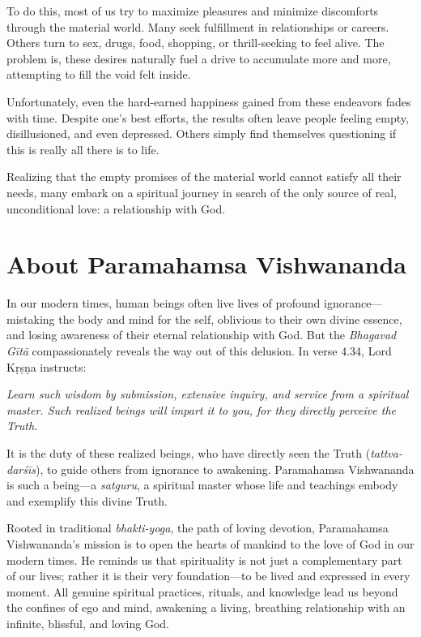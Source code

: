 \documentclass[12pt, twoside, openright]{memoir}
\begin{document}
To do this, most of us try to maximize pleasures and minimize discomforts through the material world. Many seek fulfillment in relationships or careers. Others turn to sex, drugs, food, shopping, or thrill-seeking to feel alive. The problem is, these desires naturally fuel a drive to accumulate more and more, attempting to fill the void felt inside.

Unfortunately, even the hard-earned happiness gained from these endeavors fades with time. Despite one’s best efforts, the results often leave people feeling empty, disillusioned, and even depressed. Others simply find themselves questioning if this is really all there is to life.

Realizing that the empty promises of the material world cannot satisfy all their needs, many embark on a spiritual journey in search of the only source of real, unconditional love: a relationship with God.

 \chapter{About Paramahamsa Vishwananda}\label{chap-about-paramahamsa-vishwananda}

\bigskip

In our modern times, human beings often live lives of profound ignorance---mistaking the body and mind for the self, oblivious to their own divine essence, and losing awareness of their eternal relationship with God. But the \textit{Bhagavad Gītā} compassionately reveals the way out of this delusion. In verse 4.34, Lord Kṛṣṇa instructs:

\begin{customquote}\fontsize{10}{11}\selectfont
\textit{Learn such wisdom by submission, extensive inquiry, and service from a spiritual master. Such realized beings will impart it to you, for they directly perceive the Truth.}
\end{customquote}

It is the duty of these realized beings, who have directly seen the Truth (\textit{tattva-darśīs}), to guide others from ignorance to awakening. Paramahamsa Vishwananda is such a being---a \textit{satguru}, a spiritual master whose life and teachings embody and exemplify this divine Truth.

Rooted in traditional \textit{bhakti-yoga}, the path of loving devotion, Paramahamsa Vishwananda’s mission is to open the hearts of mankind to the love of God in our modern times.  He reminds us that spirituality is not just a complementary part of our lives; rather it is their very foundation---to be lived and expressed in every moment. All genuine spiritual practices, rituals, and knowledge lead us beyond the confines of ego and mind, awakening a living, breathing relationship with an infinite, blissful, and loving God.
\end{document}
